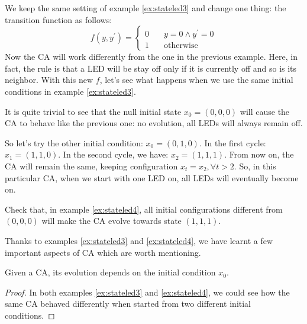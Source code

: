 \begin{example}
\label{ex:stateled4}
We keep the same setting of example \ref{ex:stateled3} and change one thing: the transition function
as follows:
\begin{equation*}
f \left( y, y^\prime \right) =
  \begin{cases}
    0       & \quad y = 0 \wedge y^\prime = 0\\
    1       & \quad \text{otherwise}
  \end{cases}
\end{equation*}
Now the CA will work differently from the one in the previous example. Here, in fact, the rule is
that a LED will be stay off only if it is currently off and so is its neighbor. With this
new $f$, let's see what happens when we use the same initial conditions in example \ref{ex:stateled3}.

It is quite trivial to see that the null initial state $x_0 = (0,0,0)$ will cause the CA to behave
like the previous one: no evolution, all LEDs will always remain off.

So let's try the other initial condition: $x_0 = (0,1,0)$. In the first cycle: $x_1 = (1,1,0)$.
In the second cycle, we have: $x_2 = (1,1,1)$. From now on, the CA will remain the same, keeping
configuration $x_t = x_2, \forall t > 2$. So, in this particular CA, when we start with one LED on,
all LEDs will eventually become on.
\end{example}

\begin{problem}
\label{prob1}
Check that, in example \ref{ex:stateled4}, all initial configurations different from $(0,0,0)$ will
make the CA evolve towards state $(1,1,1)$.
\end{problem}

Thanks to examples \ref{ex:stateled3} and \ref{ex:stateled4}, we have learnt a few important
aspects of CA which are worth mentioning.

\begin{theorem}
\label{theo:evinitcond}
Given a CA, its evolution depends on the initial condition $x_0$.
\begin{proof}
In both examples \ref{ex:stateled3} and \ref{ex:stateled4}, we could see how the same CA behaved
differently when started from two different initial conditions.
\end{proof}
\end{theorem}

